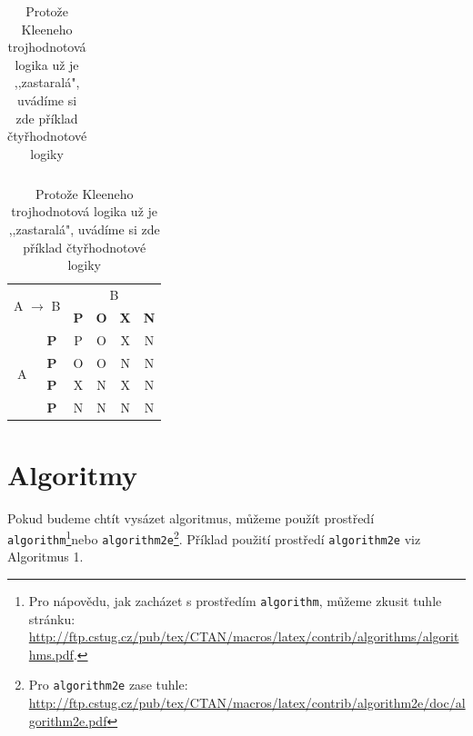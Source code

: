 \documentclass[a4paper, 11pt]{article}
\begin{document}
\begin{table}[h!]
\begin{center}
\begin{tabular}{|c|c|c|c|c|c|}
        \end{tabular}
        \begin{tabular}{|c|c|c|c|c|c|}
            \hline
            \multicolumn{2}{|c|}{\multirow{2}{*}{A ${\to}$ B}} & \multicolumn{4}{c|}{B} \\ \cline{3-6} 
            \multicolumn{2}{|c|}{}  & \textbf{P}    &\textbf{O}   &\textbf{X}   &\textbf{N} \\ 
            \hline
            \multirow{4}{*}{A}  &\textbf{P}     & P    & O   & X   & N   \\ \cline{2-6} 
                                &\textbf{P}     & O    & O   & N   & N   \\ \cline{2-6} 
                                &\textbf{P}     & X    & N   & X   & N   \\ \cline{2-6} 
                                &\textbf{P}     & N    & N   & N   & N   \\ \hline
        \end{tabular}
    \caption{Protože Kleeneho trojhodnotová logika už je ,,zastaralá", uvádíme si zde příklad čtyřhodnotové logiky}
    \end{center}
\end{table}



\newpage
\section{Algoritmy}
    Pokud budeme chtít vysázet algoritmus, můžeme použít prostředí \texttt{algorithm}\footnote{Pro nápovědu, jak zacházet s prostředím \texttt{algorithm}, můžeme zkusit tuhle stránku: \newline \hyperlink{http://ftp.cstug.cz/pub/tex/CTAN/macros/latex/contrib/algorithms/algorithms.pdf}{http://ftp.cstug.cz/pub/tex/CTAN/macros/latex/contrib/algorithms/algorithms.pdf}.}nebo \texttt{algorithm2e}\footnote{Pro \texttt{algorithm2e} zase tuhle:
    \hyperlink{http://ftp.cstug.cz/pub/tex/CTAN/macros/latex/contrib/algorithm2e/doc/algorithm2e.pdf}{http://ftp.cstug.cz/pub/tex/CTAN/macros/latex/contrib/algorithm2e/doc/algorithm2e.pdf}}.
    Příklad použití prostředí \texttt{algorithm2e} viz Algoritmus 1.
    
    \vspace{2em}
\end{document}
